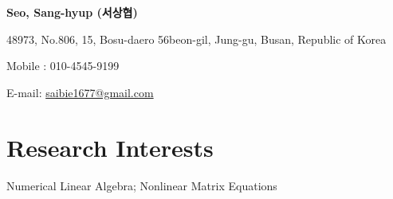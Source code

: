 \documentclass[11pt]{article} %
\begin{document}
\newpage\setcounter{page}{1}
{\LARGE\bfseries Seo, Sang-hyup (서상협)} %
\bigskip\bigskip\medskip %

48973, No.806, 15, Bosu-daero 56beon-gil, Jung-gu, Busan, Republic of Korea %
\medskip %

Mobile : 010-4545-9199 %
\medskip %

E-mail: \href{mailto:saibie1677@gmail.com}{saibie1677@gmail.com}\\ %





%


\section*{Research Interests}

Numerical Linear Algebra; Nonlinear Matrix Equations %


%
\end{document}
